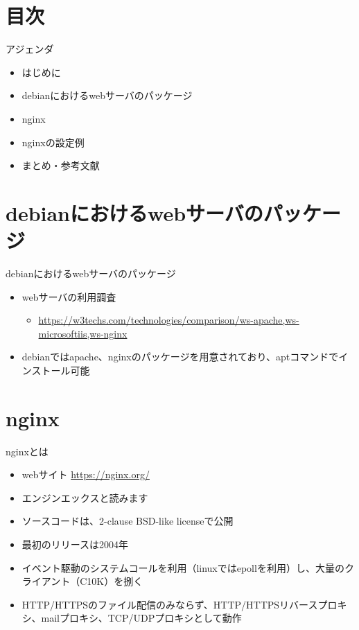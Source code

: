 \section{目次}

\begin{frame}{アジェンダ}
  \begin{itemize}
  \item はじめに
  \item debianにおけるwebサーバのパッケージ
  \item nginx
  \item nginxの設定例
  \item まとめ・参考文献
  \end{itemize}
\end{frame}


\section{debianにおけるwebサーバのパッケージ}

\begin{frame}[containsverbatim]{debianにおけるwebサーバのパッケージ}
  \begin{itemize}
  \item webサーバの利用調査
    \begin{itemize}
    \item \url{https://w3techs.com/technologies/comparison/ws-apache,ws-microsoftiis,ws-nginx}
    \end{itemize}
  \item debianではapache、nginxのパッケージを用意されており、aptコマンドでインストール可能
  \end{itemize}
\end{frame}


\section{nginx}

\begin{frame}[containsverbatim]{nginxとは}
  \begin{itemize}
  \item webサイト \url{https://nginx.org/}
  \item エンジンエックスと読みます
  \item ソースコードは、2-clause BSD-like licenseで公開
  \item 最初のリリースは2004年
  \item イベント駆動のシステムコールを利用（linuxではepollを利用）し、大量のクライアント（C10K）を捌く
  \item HTTP/HTTPSのファイル配信のみならず、HTTP/HTTPSリバースプロキシ、mailプロキシ、TCP/UDPプロキシとして動作
  \end{itemize}
\end{frame}

